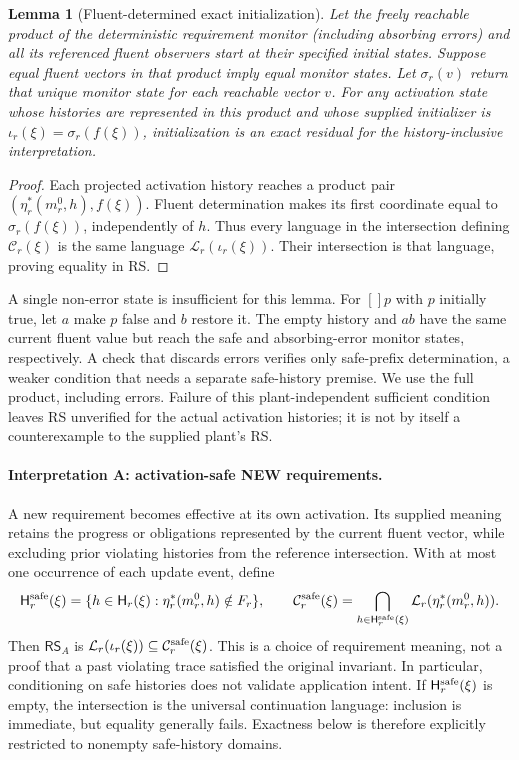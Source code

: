 \documentclass[11pt]{article}
\newtheorem{lemma}{Lemma}[section]
\begin{document}
\begin{lemma}[Fluent-determined exact initialization]
\label{lem:fluent-determined}
Let the freely reachable product of the deterministic requirement monitor (including absorbing errors) and all its referenced fluent observers start at their specified initial states. Suppose equal fluent vectors in that product imply equal monitor states. Let $\sigma_r(v)$ return that unique monitor state for each reachable vector $v$. For any activation state whose histories are represented in this product and whose supplied initializer is $\iota_r(\xi)=\sigma_r(f(\xi))$, initialization is an exact residual for the history-inclusive interpretation.
\end{lemma}
\begin{proof}
Each projected activation history reaches a product pair $(\eta_r^*(m_r^0,h),f(\xi))$. Fluent determination makes its first coordinate equal to $\sigma_r(f(\xi))$, independently of $h$. Thus every language in the intersection defining $\mathcal C_r(\xi)$ is the same language $\mathcal L_r(\iota_r(\xi))$. Their intersection is that language, proving equality in RS.
\end{proof}

A single non-error state is insufficient for this lemma. For $[]p$ with $p$ initially true, let $a$ make $p$ false and $b$ restore it. The empty history and $ab$ have the same current fluent value but reach the safe and absorbing-error monitor states, respectively. A check that discards errors verifies only safe-prefix determination, a weaker condition that needs a separate safe-history premise. We use the full product, including errors. Failure of this plant-independent sufficient condition leaves RS unverified for the actual activation histories; it is not by itself a counterexample to the supplied plant's RS.

\paragraph{Interpretation A: activation-safe NEW requirements.}
A new requirement becomes effective at its own activation. Its supplied meaning retains the progress or obligations represented by the current fluent vector, while excluding prior violating histories from the reference intersection. With at most one occurrence of each update event, define
\[
 \mathsf H_r^{\rm safe}(\xi)=\{h\in\mathsf H_r(\xi):
    \eta_r^*(m_r^0,h)\notin F_r\},\qquad
 \mathcal C_r^{\rm safe}(\xi)=\bigcap_{h\in\mathsf H_r^{\rm safe}(\xi)}
    \mathcal L_r(\eta_r^*(m_r^0,h)).
\]
Then $\mathsf{RS}_A$ is $\mathcal L_r(\iota_r(\xi))\subseteq\mathcal C_r^{\rm safe}(\xi)$.
This is a choice of requirement meaning, not a proof that a past violating trace satisfied the original invariant. In particular, conditioning on safe histories does not validate application intent. If $\mathsf H_r^{\rm safe}(\xi)$ is empty, the intersection is the universal continuation language: inclusion is immediate, but equality generally fails. Exactness below is therefore explicitly restricted to nonempty safe-history domains.
\end{document}
